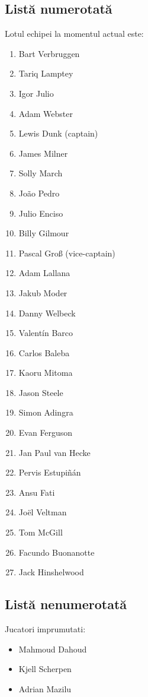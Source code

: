 \documentclass{article}
\begin{document}
\subsection{Listă numerotată}
\hspace{0.5cm}Lotul echipei la momentul actual este:
\begin{enumerate}
    	\item Bart Verbruggen
    	\item Tariq Lamptey
    	\item Igor Julio
	\item Adam Webster
   	\item Lewis Dunk (captain)
   	\item James Milner
	\item Solly March
    	\item João Pedro
	\item Julio Enciso
   	\item Billy Gilmour
   	\item Pascal Groß (vice-captain)
	\item Adam Lallana
	\item Jakub Moder
    	\item Danny Welbeck
    	\item Valentín Barco
	\item Carlos Baleba
   	\item Kaoru Mitoma
   	\item Jason Steele
	\item Simon Adingra
    	\item Evan Ferguson
	\item Jan Paul van Hecke
   	\item Pervis Estupiñán
   	\item Ansu Fati
	\item Joël Veltman
	\item Tom McGill
	\item Facundo Buonanotte
	\item Jack Hinshelwood

\end{enumerate}

\subsection{Listă nenumerotată}
\hspace{0.5cm}Jucatori imprumutati:
\begin{itemize}
    \item Mahmoud Dahoud
    \item Kjell Scherpen
    \item Adrian Mazilu
\end{itemize}
\end{document}
